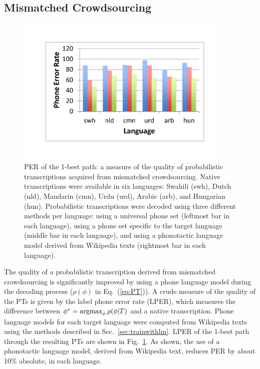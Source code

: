 \subsection{Mismatched Crowdsourcing}
\label{s6:mc}

\begin{figure}
  \centerline{\includegraphics[width=4in]{../figs/lm_results.pdf}}
  \caption{PER of the 1-best path: a measure of the quality of
    probabilistic transcriptions acquired from mismatched
    crowdsourcing.  Native transcriptions were available in six
    languages: Swahili (swh), Dutch (nld), Mandarin (cmn), Urdu (urd),
    Arabic (arb), and Hungarian (hun).  Probabilistic transcriptions
    were decoded using three different methods per language: using a
    universal phone set (leftmost bar in each language), using a
    phone set specific to the target language (middle bar in each
    language), and using a phonotactic language model derived from
    Wikipedia texts (rightmost bar in each language).}
  \label{fig:pt_decode_per}
\end{figure}

The quality of a probabilistic transcription derived from mismatched
crowdsourcing is significantly improved by using a phone language
model during the decoding process ($\rho(\phi)$ in Eq.~(\ref{eq:PT})).
A crude measure of the quality of the PTs is given by the label phone error
rate (LPER), which measures the difference
between $\phi^* = \operatorname*{argmax}_{\phi} \rho(\phi|T)$ and a native transcription. Phone
language models for each target language were computed from Wikipedia
texts using the methods described in Sec.~\ref{sec:trainwithlm}.
LPER of the 1-best path through the resulting PTs are shown in
Fig.~\ref{fig:pt_decode_per}.  As shown, the use of a phonotactic
language model, derived from Wikipedia text, reduces PER by about 10\%
absolute, in each language.

